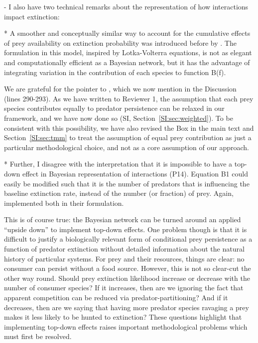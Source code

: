 \documentclass[11pt]{article}
\newcommand{\SI}{SI}
\newcommand{\us}{\rm \setlength{\leftskip}{0.3cm} \setlength{\rightskip}{0.3cm}}
\newcommand{\them}{\it \setlength{\leftskip}{0cm} \setlength{\rightskip}{0cm}}
\begin{document}
\them

- I also have two technical remarks about the representation of how interactions impact extinction:

* A smoother and conceptually similar way to account for the cumulative effects of prey availability on extinction probability was introduced before by \citet{Cazellesetal2015}. The formulation in this model, inspired by Lotka-Volterra equations, is not as elegant and computationally efficient as a Bayesian network, but it has the advantage of integrating variation in the contribution of each species to function B(f).

\us

We are grateful for the pointer to \citet{Cazellesetal2015}, which we now mention in the Discussion (lines 290-293). As we have written to Reviewer 1, the assumption that each prey species contributes equally to predator persistence can be relaxed in our framework, and we have now done so (\SI, Section~\ref{SI:sec:weighted}). To be consistent with this possibility, we have also revised the Box in the main text and Section~\ref{SI:sec:tmm} to treat the assumption of equal prey contribution as just a particular methodological choice, and not as a core assumption of our approach.

\them

* Further, I disagree with the interpretation that it is impossible to have a top-down effect in Bayesian representation of interactions (P14). Equation B1 could easily be modified such that it is the number of predators that is influencing the baseline extinction rate, instead of the number (or fraction) of prey. Again, \citet{Cazellesetal2015} implemented both in their formulation.

\us

This is of course true: the Bayesian network can be turned around an applied ``upside down'' to implement top-down effects. One problem though is that it is difficult to justify a biologically relevant form of conditional prey persistence as a function of predator extinction without detailed information about the natural history of particular systems. For prey and their resources, things are clear: no consumer can persist without a food source. However, this is not so clear-cut the other way round. Should prey extinction likelihood increase or decrease with the number of consumer species? If it increases, then are we ignoring the fact that apparent competition can be reduced via predator-partitioning? And if it decreases, then are we saying that having more predator species ravaging a prey makes it less likely to be hunted to extinction? These questions highlight that implementing top-down effects raises important methodological problems which must first be resolved.
\end{document}

